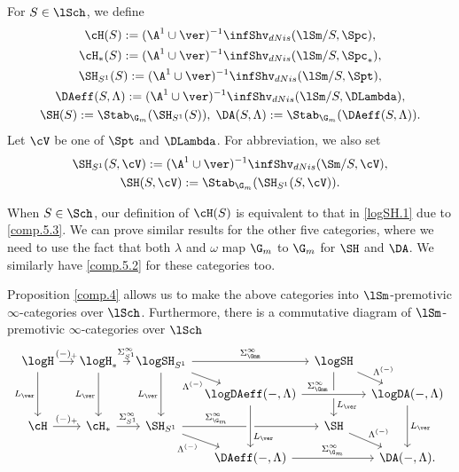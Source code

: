 \documentclass[10pt]{amsart}
\begin{document}
\begin{df}
\label{comp.3}
For $S\in \lSch$, we define
\begin{gather*}
\cH(S)
:=
(\A^1\cup \ver)^{-1}\infShv_{dNis}(\lSm/S,\Spc),
\\
\cH_*(S)
:=
(\A^1\cup \ver)^{-1}\infShv_{dNis}(\lSm/S,\Spc_*),
\\
\SH_{S^1}(S)
:=
(\A^1\cup \ver)^{-1}\infShv_{dNis}(\lSm/S,\Spt),
\\
\DAeff(S,\Lambda)
:=
(\A^1\cup \ver)^{-1}\infShv_{dNis}(\lSm/S,\DLambda),
\\
\SH(S)
:=
\Stab_{\G_m}(\SH_{S^1}(S)),
\;
\DA(S,\Lambda)
:=
\Stab_{\G_m}(\DAeff(S,\Lambda)).
\end{gather*}
Let $\cV$ be one of $\Spt$ and $\DLambda$.
For abbreviation, we also set
\begin{gather*}
\SH_{S^1}(S,\cV)
:=
(\A^1\cup \ver)^{-1}\infShv_{dNis}(\Sm/S,\cV),
\\
\SH(S,\cV)
:=
\Stab_{\G_m}(\SH_{S^1}(S,\cV)).
\end{gather*}
\end{df}

\begin{rmk}
When $S\in \Sch$, our definition of $\cH(S)$ is equivalent to that in \eqref{logSH.1} due to \eqref{comp.5.3}.
We can prove similar results for the other five categories, where we need to use the fact that both $\lambda$ and $\omega$ map $\G_m$ to $\G_m$ for $\SH$ and $\DA$.
We similarly have \eqref{comp.5.2} for these categories too.

Proposition \ref{comp.4} allows us to make the above categories into $\lSm$-premotivic $\infty$-categories over $\lSch$.
Furthermore, there is a commutative diagram of $\lSm$-premotivic $\infty$-categories over $\lSch$
\begin{equation}
\begin{tikzcd}[column sep=tiny, row sep=small]
\logH\ar[rr,"(-)_+"]\ar[dd,"L_{\ver}"']&&
\logH_*\ar[r,"\Sigma_{S^1}^\infty"]\ar[dd,"L_{\ver}"']&
\logSH_{S^1}\ar[rr,"\Sigma_{\Gmm}^\infty"]\ar[dd,"L_{\ver}"']\ar[rd,"\Lambda^{(-)}"']&
&
\logSH\ar[dd,"L_{\ver}",near end]\ar[rd,"\Lambda^{(-)}"]
\\
&
&
&
&
\logDAeff(-,\Lambda)\ar[rr,"\Sigma_{\Gmm}^\infty",near start,crossing over]&
&
\logDA(-,\Lambda)\ar[dd,"L_{\ver}"]
\\
\cH\ar[rr,"(-)_+"]&&
\cH_*\ar[r,"\Sigma_{S^1}^\infty"]&
\SH_{S^1}\ar[rr,"\Sigma_{\G_m}^\infty",near start]\ar[rd,"\Lambda^{(-)}"']&
&
\SH\ar[rd,"\Lambda^{(-)}"]
\\
&
&
&
&
\DAeff(-,\Lambda)\ar[rr,"\Sigma_{\G_m}^\infty"]\ar[uu,leftarrow,"L_{\ver}"',crossing over,near start]&
&
\DA(-,\Lambda).
\end{tikzcd}
\end{equation}
\end{rmk}
\end{document}
